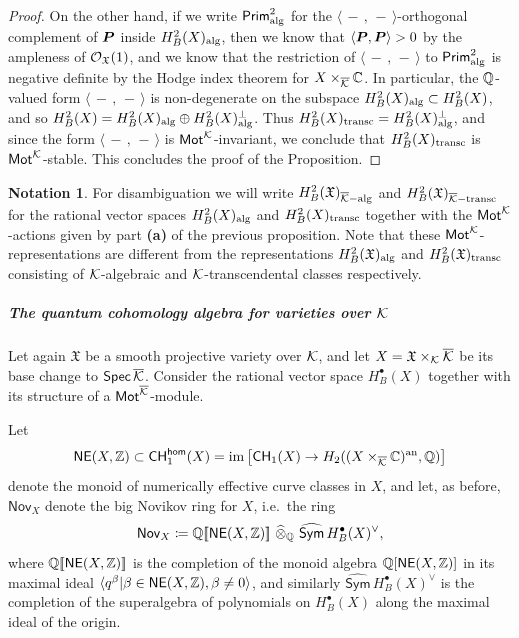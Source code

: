\documentclass[twoside,leqno]{article}
\numberwithin{equation}{section}
\theoremstyle{plain}
\theoremstyle{definition}
\newtheorem{notation}[equation]{Notation}
\begin{document}
\begin{proof}
On the other hand, if we
write $\mathsf{Prim}^{2}_{\operatorname{alg}}$ for the $\langle\,-\,,\,
-\,\rangle$-orthogonal complement of $\boldsymbol{P}$ inside
$H^{2}_{B}(X)_{\operatorname{alg}}$, then we know that $\langle \boldsymbol{P}, \boldsymbol{P} \rangle > 0$ by
the ampleness of $\mathcal O_{\mathfrak{X}}(1)$, and we know that the restriction of
$\langle\,-\,,\, -\,\rangle$ to $\mathsf{Prim}^{2}_{\operatorname{alg}}$ is
negative definite by the Hodge index theorem for $X\times_{\overline{\mathcal K}}\mathbb C$.
In particular, the $\mathbb Q$-valued form $\langle\,-\,,\, -\,\rangle$  is non-degenerate on the subspace $H^{2}_{B}(X)_{\operatorname{alg}} \subset H^{2}_{B}(X)$, and so 
$H^{2}_{B}(X) = H^{2}_{B}(X)_{\operatorname{alg}}\oplus H^{2}_{B}(X)_{\operatorname{alg}}^{\perp}$. Thus $H^{2}_{B}(X)_{\operatorname{transc}} = H^{2}_{B}(X)_{\operatorname{alg}}^{\perp}$, and since the form  $\langle \, - \, ,\,  - \, \rangle$ is $\mathsf{Mot}^{\mathcal K}$-invariant, we conclude that $H^{2}_{B}(X)_{\operatorname{transc}}$ is $\mathsf{Mot}^{\mathcal K}$-stable. This concludes the proof of the Proposition. 
\end{proof}

\medskip

\begin{notation}
    For disambiguation we will write $H^{2}_{B}(\mathfrak{X})_{\overline{\mathcal K}-\operatorname{alg}}$ and
$H^{2}_{B}(\mathfrak{X})_{\overline{\mathcal K}-\operatorname{transc}}$ for  the rational vector spaces
$H^{2}_{B}(X)_{\operatorname{alg}}$ and $H^{2}_{B}(X)_{\operatorname{transc}}$ together 
    with the $\mathsf{Mot}^{\mathcal K}$-actions given by part {\bfseries (a)} of
    the previous proposition. Note that these
$\mathsf{Mot}^{\mathcal K}$-representations are different from the representations
$H^{2}_{B}(\mathfrak{X})_{\operatorname{alg}}$ and
$H^{2}_{B}(\mathfrak{X})_{\operatorname{transc}}$ consisting of $\mathcal K$-algebraic
and $\mathcal K$-transcendental classes respectively.
\end{notation}

\subparagraph{The quantum cohomology algebra for varieties over $\mathcal K$} \label{subpar:qcoh}

Let again $\mathfrak{X}$ be a smooth projective variety over $\mathcal K$,
and let $X = \mathfrak{X}\times_{\mathcal K} \overline{\mathcal K}$ be its base change to
$\mathsf{Spec} \, \overline{\mathcal K}$. Consider the rational vector space
$H^{\bullet}_{B}(X)$ together with its structure of a
$\mathsf{Mot}^{\overline{\mathcal K}}$-module.


Let
\[
\mathsf{NE}(X,\mathbb Z) \subset \mathsf{CH}^{\mathsf{hom}}_{1}(X)  =
\operatorname{im}\left[ \mathsf{CH}_{1}(X) \to
  H_{2}((X\times_{\overline{\mathcal K}} \mathbb C)^{\operatorname{an}},\mathbb Q) \right]
\]
denote the monoid of numerically effective curve classes in $X$, and 
let, as before,  $\mathsf{Nov}_{X}$ denote the big
Novikov ring for $X$, i.e.\ the ring
\[
\mathsf{Nov}_{X} \coloneqq \mathbb Q[\![\mathsf{NE}(X,\mathbb Z)]\!]\ \widehat{\otimes}_{\mathbb Q} \
\widehat{\mathsf{Sym}}\, H^{\bullet}_{B}(X)^{\vee},
\]
where $\mathbb Q[\![\mathsf{NE}(X,\mathbb Z)]\!]$ is the completion of the monoid
algebra $\mathbb Q[\mathsf{NE}(X,\mathbb Z)]$ in its maximal ideal $\langle
q^{\beta} | \beta \in \mathsf{NE}(X,\mathbb Z), \beta \neq 0 \rangle$, and
similarly $\widehat{\mathsf{Sym}}\, H^{\bullet}_{B}(X)^{\vee}$ is the
completion of the superalgebra of polynomials on $H^{\bullet}_{B}(X)$
along the maximal ideal of the origin.
\end{document}
